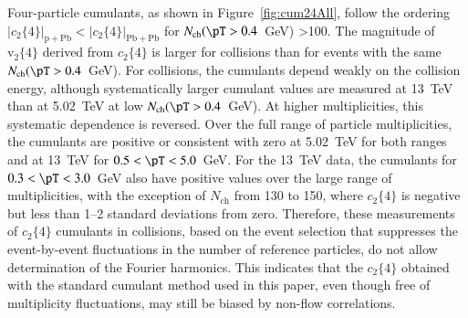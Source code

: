 \documentclass[cernpreprint,texlive=2014,txfonts,UKenglish]{latex/atlasdoc}
\begin{document}
Four-particle cumulants, as shown in Figure~\ref{fig:cum24All},  follow the ordering $|c_2\{4\}|_{\mathrm{p+Pb}} < |c_2\{4\}|_{\mathrm{Pb+Pb}}$ for $N_{\mathrm{ch}}(\pT > 0.4$~GeV) >100.  The magnitude of $\mathrm{v}_2\{4\}$ derived from $c_2\{4\}$ is larger for \PbPb collisions than for \pPb events with the same $N_{\mathrm{ch}}(\pT > 0.4$~GeV). For \pp collisions, 
the cumulants depend weakly on the collision energy, although systematically larger cumulant values are measured at 13~TeV than at 5.02~TeV at low $N_{\mathrm{ch}}(\pT > 0.4$~GeV). At higher multiplicities, this systematic dependence is reversed.  Over the full range of particle multiplicities, the cumulants are positive or consistent with zero at 5.02~TeV for both \pT ranges and at 13~TeV for  $0.5< \pT < 5.0$~GeV.  For the 13~TeV \pp data, the cumulants for $0.3< \pT < 3.0$~GeV also have positive values over the large range of multiplicities, with the exception of   $N_{\mathrm{ch}}$ from 130 to 150, where $c_2\{4\}$ is negative but less than 1--2 standard deviations from zero. Therefore, these measurements of $c_2\{4\}$ cumulants in \pp collisions, based on the event selection that suppresses the event-by-event fluctuations in the number of reference particles, do not allow determination of the Fourier harmonics. This indicates that the $c_2\{4\}$  obtained with the standard cumulant method used in this paper, even though free of multiplicity fluctuations, may still be biased by non-flow correlations. 
\end{document}
